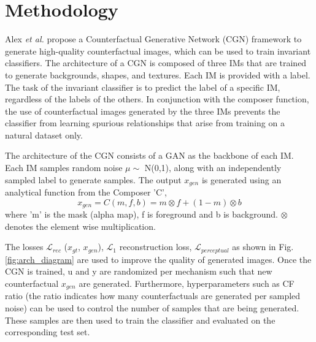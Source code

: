 \section{Methodology}
Alex \textit{et al.} \cite{sauer2021counterfactual} propose a Counterfactual Generative Network (CGN) framework to generate high-quality counterfactual images, which can be used to train invariant classifiers. The architecture of a CGN is composed of three IMs that are trained to generate backgrounds, shapes, and textures. Each IM is provided with a label. The task of the invariant classifier is to predict the label of a specific IM, regardless of the labels of the others. In conjunction with the composer function, the use of counterfactual images generated by the three IMs prevents the classifier from learning spurious relationships that arise from training on a natural dataset only.




The architecture of the CGN consists of a GAN as the backbone of each IM. 
Each IM samples random noise $\mu \sim$ N(0,1), along with an independently sampled label to generate samples. The output $x_{gen}$ is generated using an analytical function from the Composer 
'C',
$$x_{gen} = C(m,f,b) = m \otimes f + (1-m) \otimes b$$ 
where 'm' is the mask (alpha map), f is foreground and b is background. $\otimes$  denotes the element wise multiplication. 

The losses $\mathcal{L}_{rec}$ ($x_{gt}$, $x_{gen}$), $\mathcal{L}_{1}$ reconstruction loss, $\mathcal{L}_{perceptual}$ as shown in Fig. \ref{fig:arch_diagram} are used to improve the quality of generated images. Once the CGN is trained, u and y are randomized per mechanism such that new counterfactual $x_{gen}$ are generated. Furthermore, hyperparameters such as CF ratio (the ratio indicates how many counterfactuals are generated per sampled noise) can be used to control the number of samples that are being generated. These samples are then used to train the classifier and evaluated on the corresponding test set. 


